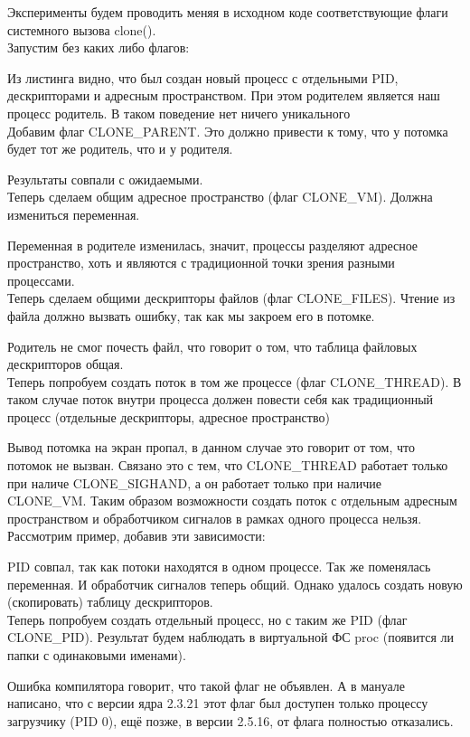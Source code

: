 \documentclass[a4paper]{article}
\begin{document}
	
	Эксперименты будем проводить меняя в исходном коде соответствующие флаги системного вызова clone().\\		Запустим без каких либо флагов:
	
	Из листинга видно, что был создан новый процесс с отдельными PID, дескрипторами и адресным пространством. При этом родителем является наш процесс родитель. В таком поведение нет ничего уникального\\
	
	Добавим флаг CLONE\_PARENT. Это должно привести к тому, что у потомка будет тот же родитель, что и у родителя.
	
	Результаты совпали с ожидаемыми.\\

	Теперь сделаем общим адресное пространство (флаг CLONE\_VM). Должна измениться переменная.	
	
	Переменная в родителе изменилась, значит, процессы разделяют адресное пространство, хоть и являются с традиционной точки зрения разными процессами.\\

	Теперь сделаем общими дескрипторы файлов (флаг CLONE\_FILES). Чтение из файла должно вызвать ошибку, так как мы закроем его в потомке.
	
	Родитель не смог почесть файл, что говорит о том, что таблица файловых дескрипторов общая.\\

	Теперь попробуем создать поток в том же процессе (флаг CLONE\_THREAD). В таком случае поток внутри процесса должен повести себя как традиционный процесс (отдельные дескрипторы, адресное пространство)
	
	Вывод потомка на экран пропал, в данном случае это говорит от том, что потомок не вызван. Связано это с тем, что CLONE\_THREAD работает только при наличе CLONE\_SIGHAND, а он работает только при наличие CLONE\_VM. Таким образом возможности создать поток с отдельным адресным пространством и обработчиком сигналов в рамках одного процесса нельзя. Рассмотрим пример, добавив эти зависимости:
	
	PID совпал, так как потоки находятся в одном процессе. Так же поменялась переменная. И обработчик сигналов теперь общий. Однако удалось создать новую (скопировать) таблицу дескрипторов.\\

	Теперь попробуем создать отдельный процесс, но с таким же PID (флаг CLONE\_PID). Результат будем наблюдать в виртуальной ФС proc (появится ли папки с одинаковыми именами).
	
	Ошибка компилятора говорит, что такой флаг не объявлен. А в мануале написано, что с версии ядра 2.3.21 этот флаг был доступен только процессу загрузчику (PID 0), ещё позже, в версии 2.5.16, от флага полностью отказались.
	
\end{document}
